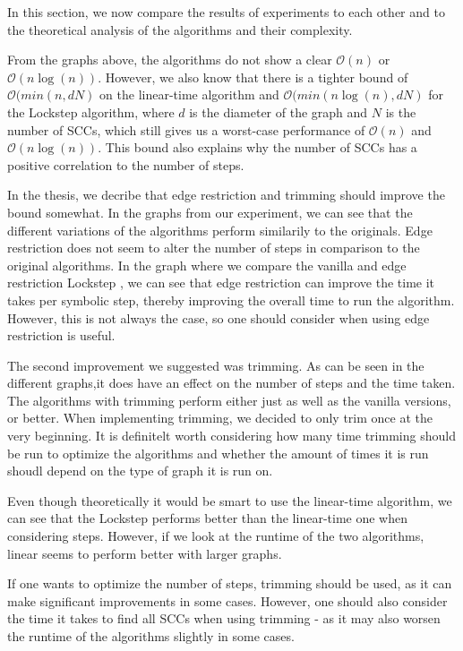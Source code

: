 \documentclass[../master/master.tex]{subfiles}
\begin{document}
In this section, we now compare the results of experiments to each other and to the theoretical analysis of the algorithms and their complexity.

From the graphs above, the algorithms do not show a clear $\mathcal{O}(n)$ or $\mathcal{O}(n\log(n))$. However, we also know that there is a tighter bound of $\mathcal{O}(min(n, dN)$ on the linear-time algorithm and $\mathcal{O}(min(n\log(n), dN)$ for the Lockstep algorithm, where $d$ is the diameter of the graph and $N$ is the number of SCCs, which still gives us a worst-case performance of $\mathcal{O}(n)$ and $\mathcal{O}(n\log(n))$. This bound also explains why the number of SCCs has a positive correlation to the number of steps.

In the thesis, we decribe that edge restriction and trimming should improve the bound somewhat. In the graphs from our experiment, we can see that the different variations of the algorithms perform similarily to the originals. Edge restriction does not seem to alter the number of steps in comparison to the original algorithms. In the graph where we compare the vanilla and edge restriction Lockstep , we can see that edge restriction can improve the time it takes per symbolic step, thereby improving the overall time to run the algorithm. However, this is not always the case, so one should consider when using edge restriction is useful.

The second improvement we suggested was trimming. As can be seen in the different graphs,it does have an effect on the number of steps and the time taken. The algorithms with trimming perform either just as well as the vanilla versions, or better. When implementing trimming, we decided to only trim once at the very beginning. It is definitelt worth considering how many time trimming should be run to optimize the algorithms and whether the amount of times it is run shoudl depend on the type of graph it is run on.


Even though theoretically it would be smart to use the linear-time algorithm, we can see that the Lockstep performs better than the linear-time one when considering steps. However, if we look at the runtime of the two algorithms, linear seems to perform better with larger graphs.

If one wants to optimize the number of steps, trimming should be used, as it can make significant improvements in some cases. However, one should also consider the time it takes to find all SCCs when using trimming - as it may also worsen the runtime of the algorithms slightly in some cases.
\end{document}
